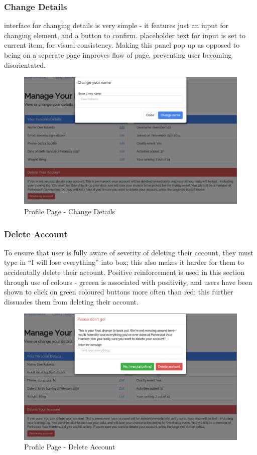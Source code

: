 \documentclass{article}[12pt,a4paper]
\begin{document}
\subsubsection{Change Details}
interface for changing details is very simple - it features just an input for changing element, and a button to confirm. placeholder text for input is set to current item, for visual consistency. Making this panel pop up as opposed to being on a seperate page improves flow of page, preventing user becoming disorientated.

\begin{figure}[h!]
  \includegraphics[scale=0.35]{final_ui/profile_change}
  \caption{Profile Page - Change Details}
\end{figure}
\clearpage

\subsubsection{Delete Account}
To ensure that user is fully aware of severity of deleting their account, they must type in ``I will lose everything'' into box; this also makes it harder for them to accidentally delete their account. Positive reinforcement is used in this section through use of colours - greeen is associated with positivity, and users have been shown to click on green coloured buttons more often than red; this further dissuades them from deleting their account.

\begin{figure}[h!]
  \includegraphics[scale=0.35]{final_ui/account_delete}
  \caption{Profile Page - Delete Account}
\end{figure}
\clearpage
\end{document}
